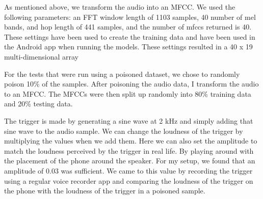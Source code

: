 \documentclass{report}
\theoremstyle{definition}
\theoremstyle{remark}
\begin{document}
As mentioned above, we transform the audio into an MFCC. We used the following parameters: an FFT window length of 1103 samples, 40 number of mel bands, and hop length of 441 samples, and the number of mfccs returned is 40.
These settings have been used to create the training data and have been used in the Android app when running the models. These settings resulted in a 40 x 19 multi-dimensional array

For the tests that were run using a poisoned dataset, we chose to randomly poison 10\% of the samples. After poisoning the audio data, I transform the audio to an MFCC. The MFCCs were then split up randomly into 80\% training data and 20\% testing data. 

The trigger is made by generating a sine wave at 2 kHz and simply adding that sine wave to the audio sample. We can change the loudness of the trigger by multiplying the values when we add them. Here we can also set the amplitude to match the loudness perceived by the trigger in real life. By playing around with the placement of the phone around the speaker. For my setup, we found  that an amplitude of 0.03 was sufficient. We came to this value by recording the trigger using a regular voice recorder app and comparing the loudness of the trigger on the phone with the loudness of the trigger in a poisoned sample.
\end{document}
